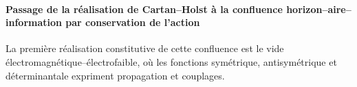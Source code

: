 \paragraph{Passage de la réalisation de Cartan–Holst à la confluence horizon–aire–information par conservation de l’action} La première réalisation constitutive de cette confluence est le vide électromagnétique--électrofaible, où les fonctions symétrique, antisymétrique et déterminantale expriment propagation et couplages.
